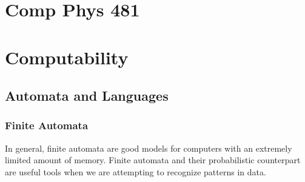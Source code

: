 \documentclass[12pt, a4paper, oneside, openright, titlepage]{book}
\begin{document}
\part{Comp Phys 481}









\part{Computability}

\chapter{Automata and Languages}


\section{Finite Automata}

In general, finite automata are good models for computers with an extremely limited amount of memory. Finite automata and their probabilistic counterpart  are useful tools when we are attempting to recognize patterns in data. 
\end{document}
